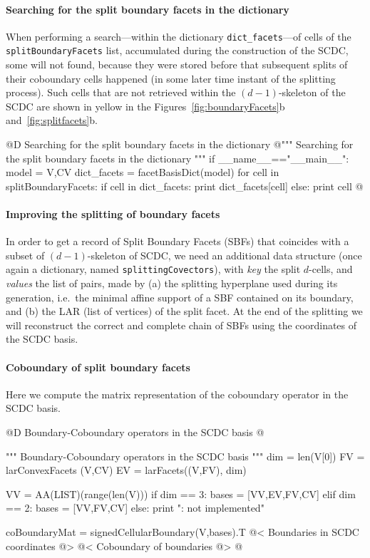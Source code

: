 \documentclass[11pt,oneside]{article}	%
\begin{document}
\paragraph{Searching for the split boundary facets in the dictionary}
When performing a search---within the dictionary \texttt{dict\_facets}---of cells of the  \texttt{splitBoundaryFacets} list, accumulated during the construction of the SCDC, some
will not found, because they were stored before that subsequent splits of their coboundary cells
happened (in some later time instant of the splitting process). Such cells that are not retrieved within the $(d-1)$-skeleton of the SCDC are shown in yellow in the Figures~\ref{fig:boundaryFacets}b and~\ref{fig:splitfacets}b.

@D Searching for the split boundary facets in the dictionary
@{""" Searching for the split boundary facets in the dictionary """
if __name__=="__main__":
	model = V,CV
	dict_facets = facetBasisDict(model)
	for cell in splitBoundaryFacets: 
		if cell in dict_facets:
			print dict_facets[cell]
		else: print cell
@}

\paragraph{Improving the splitting of boundary facets}
In order to get a record of Split Boundary Facets (SBFs) that coincides with a subset of $(d-1)$-skeleton of SCDC, we need an additional data structure (once again a dictionary, named \texttt{splittingCovectors}), with \emph{key} the split $d$-cells, and \emph{values} the list of pairs, made by (a) the splitting hyperplane used during its generation, i.e.~the minimal affine support of a SBF contained on its boundary, and (b) the LAR (list of vertices) of the split facet. At the end of the splitting we will reconstruct the correct and complete chain of SBFs using the coordinates of the SCDC basis.




\paragraph{Coboundary of split boundary facets}

Here we compute the matrix representation of the coboundary operator in the SCDC basis.

@D Boundary-Coboundary operators in the SCDC basis
@{""" Boundary-Coboundary operators in the SCDC basis """
dim = len(V[0])
FV = larConvexFacets (V,CV)
EV = larFacets((V,FV), dim)

VV = AA(LIST)(range(len(V)))
if dim == 3: bases = [VV,EV,FV,CV]
elif dim == 2: bases = [VV,FV,CV]
else: print "\nerror: not implemented\n"

coBoundaryMat = signedCellularBoundary(V,bases).T
@< Boundaries in SCDC coordinates @>
@< Coboundary of boundaries @>
@}
\end{document}

